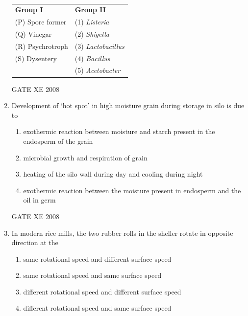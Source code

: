 \documentclass[12pt]{article}
\begin{document}
\begin{enumerate}
\begin{table}[H]     \centering     \caption{}     \label{}     \begin{tabular}{l l}

\textbf{Group I} & \textbf{Group II} \\
(P) Spore former & (1) \textit{Listeria} \\
(Q) Vinegar & (2) \textit{Shigella} \\
(R) Psychrotroph & (3) \textit{Lactobacillus} \\
(S) Dysentery & (4) \textit{Bacillus} \\
 & (5) \textit{Acetobacter} \\
\end{tabular} \end{table}  

\begin{enumerate}
\end{enumerate}

GATE XE 2008

\item Development of ‘hot spot’ in high moisture grain during storage in silo is due to  

\begin{enumerate}
\item  exothermic reaction between moisture and starch present in the endosperm of the grain 
\item  microbial growth and respiration of grain 
\item  heating of the silo wall during day and cooling during night 
\item  exothermic reaction between the moisture present in endosperm and the oil in germ 
\end{enumerate}

GATE XE 2008

\item In modern rice mills, the two rubber rolls in the sheller rotate in opposite direction at the  

\begin{enumerate}
\item  same rotational speed and different surface speed 
\item  same rotational speed and same surface speed  
\item  different rotational speed and different surface speed  
\item  different rotational speed and same surface speed  
\end{enumerate}


\end{enumerate}
\end{document}
